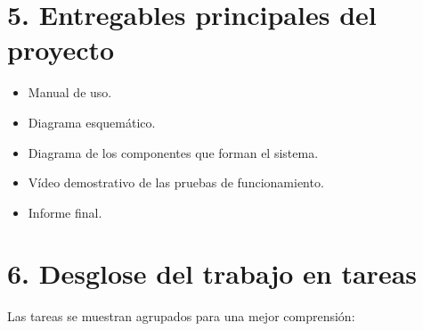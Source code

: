 \documentclass[11pt]{charter}
\begin{document}
\section{5. Entregables principales del proyecto}
\label{sec:entregables}
\begin{itemize}
\item Manual de uso.
\item Diagrama esquemático.
\item Diagrama de los componentes que forman el sistema.
\item Vídeo demostrativo de las pruebas de funcionamiento.
\item Informe final.
\end{itemize}
\section{6. Desglose del trabajo en tareas}
\label{sec:wbs}
Las tareas se muestran agrupados para una mejor comprensión:
\end{document}
